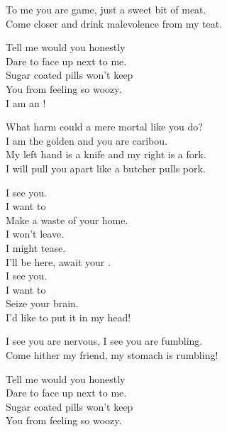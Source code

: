 
To me you are game, just a sweet bit of meat. \\
Come closer and drink malevolence from my teat. \\


Tell me would you honestly \\
Dare to face up next to me. \\
Sugar coated pills won't keep \\
You from feeling so woozy. \\

I am an ! \\


What harm could a mere mortal like you do? \\
I am the golden  and you are caribou. \\

My left hand is a knife and my right is a fork. \\
I will pull you apart like a butcher pulls pork. \\


I see you. \\
I want to \\
Make a waste of your home. \\

I won't leave. \\
I might tease. \\
I'll be here, await your . \\

I see you. \\
I want to \\
Seize your brain. \\
I'd like to put it in my head! \\


I see you are nervous, I see you are fumbling. \\
Come hither my friend, my stomach is rumbling! \\


Tell me would you honestly \\
Dare to face up next to me. \\
Sugar coated pills won't keep \\
You from feeling so woozy. \\

